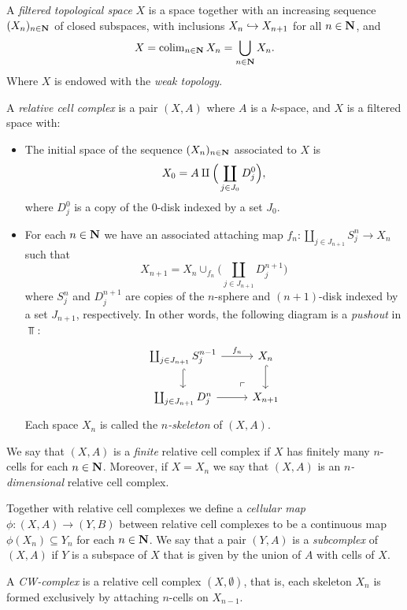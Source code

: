 \begin{definition}
\label{def:filtered-space}
A \emph{filtered topological space} \(X\) is a space together with an increasing
sequence \((X_n)_{n \in \mathbf{N}}\) of closed subspaces, with inclusions
\(X_n \hookrightarrow X_{n+1}\) for all \(n \in \mathbf{N}\), and
\[
X = \operatorname{colim}_{n \in \mathbf{N}} X_n = \bigcup_{n \in \mathbf{N}} X_n.
\]
Where \(X\) is endowed with the \emph{weak topology}.
\end{definition}

\begin{definition}
\label{def:relative-cell-complex}
A \emph{relative cell complex} is a pair \((X, A)\) where \(A\) is a
\(k\)-space, and \(X\) is a filtered space with:
\begin{itemize}\setlength\itemsep{0em}
\item The initial space of the sequence \((X_n)_{n \in \mathbf{N}}\) associated to \(X\)
  is
  \[
  X_0 = A \amalg \Big( \coprod_{j \in J_0} D_j^0 \Big),
  \]
  where \(D_j^0\) is a copy of the \(0\)-disk indexed by a set \(J_0\).

\item For each \(n \in \mathbf{N}\) we have an associated attaching map
  \(f_n: \coprod_{j \in J_{n+1}} S_j^n \to X_n\) such that
  \[
  X_{n+1} = X_n \cup_{f_n} \Big( \coprod_{j \in J_{n+1}} D_j^{n+1} \Big)
  \]
  where \(S_j^n\) and \(D_j^{n+1}\) are copies of the \(n\)-sphere and
  \((n+1)\)-disk indexed by a set \(J_{n+1}\), respectively. In other words, the
  following diagram is a \emph{pushout} in \(\Top\):
  \[
  \begin{tikzcd}
  \coprod_{j \in J_{n+1}} S_j^{n-1} \ar[r, "f_n"] \ar[d, hook]
  \ar[rd, phantom, "\ulcorner", very near end]
  &X_n \ar[d, hook]
  \\
  \coprod_{j \in J_{n+1}} D_j^n \ar[r] &X_{n+1}
  \end{tikzcd}
  \]
  Each space \(X_n\) is called the \emph{\(n\)-skeleton} of \((X, A)\).
\end{itemize}
We say that \((X, A)\) is a \emph{finite} relative cell complex if \(X\) has
finitely many \(n\)-cells for each \(n \in \mathbf{N}\). Moreover, if \(X = X_n\) we say
that \((X, A)\) is an \emph{\(n\)-dimensional} relative cell complex.

Together with relative cell complexes we define a \emph{cellular map}
\(\phi: (X, A) \to (Y, B)\) between relative cell complexes to be a continuous
map \(\phi(X_n) \subseteq Y_n\) for each \(n \in \mathbf{N}\). We say that a pair
\((Y, A)\) is a \emph{subcomplex} of \((X, A)\) if \(Y\) is a subspace of \(X\)
that is given by the union of \(A\) with cells of \(X\).

A \emph{CW-complex} is a relative cell complex \((X, \emptyset)\), that is, each
skeleton \(X_n\) is formed exclusively by attaching \(n\)-cells on
\(X_{n-1}\).
\end{definition}


